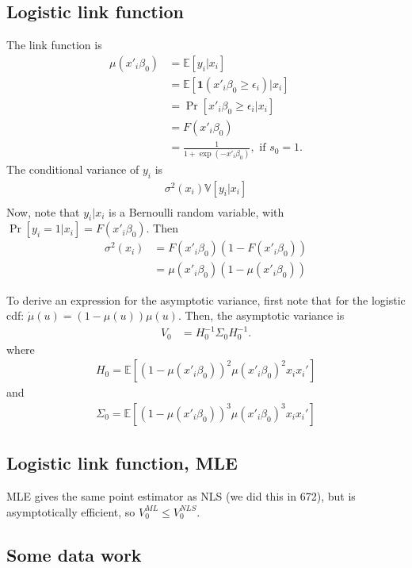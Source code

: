 \documentclass[12pt]{article}
\newcommand{\E}{\mathbb{E}}
\newcommand{\V}{\mathbb{V}}
\newcommand{\e}{\epsilon}
\newcommand{\mtx}[1]{\ensuremath{\bm{\mathit{#1}}}}
\begin{document}
\subsection{Logistic link function}
The link function is
\begin{align*}
\mu(\mtx{x}'_i\mtx{\beta}_0) &=\E[y_i|\mtx{x}_i]\\
&= \E[\bm{1}(\mtx{x}'_i\mtx{\beta}_0 \geq \e_i) |\mtx{x}_i ]\\
&=\Pr[\mtx{x}'_i\mtx{\beta}_0 \geq \e_i |\mtx{x}_i ]\\
&= F(\mtx{x}'_i\mtx{\beta}_0)\\
&= \frac{1}{1+ \exp(-\mtx{x}'_i\mtx{\beta}_0)}, \text{ if } s_0 = 1.
\end{align*}
The conditional variance of $y_i$ is
\begin{align*}
\sigma^2(\mtx{x}_i)  \V[y_i | \mtx{x}_i]\\
\end{align*}
Now, note that $y_i|\mtx{x}_i$ is a Bernoulli random variable, with $\Pr[y_i=1 |\mtx{x}_i] = F(\mtx{x}'_i\mtx{\beta}_0)$. Then
\begin{align*}
\sigma^2(\mtx{x}_i)  &= F(\mtx{x}'_i\mtx{\beta}_0)(1-F(\mtx{x}'_i\mtx{\beta}_0))\\
&= \mu(\mtx{x}'_i\mtx{\beta}_0)(1-\mu(\mtx{x}'_i\mtx{\beta}_0))
\end{align*}

To derive an expression for the asymptotic variance, first note that for the logistic cdf: $\dot \mu(u) = (1-\mu(u))\mu(u)$. Then, the asymptotic variance is 
\begin{align*}
\mtx{V}_0 &= H_0^{-1}\Sigma_0 H_0^{-1}.
\end{align*}
where
\begin{align*}
H_0 = \E[(1-\mu(\mtx{x}'_i\mtx{\beta}_0))^2 \mu(\mtx{x}'_i\mtx{\beta}_0)^2 \mtx{x}_i\mtx{x}_i']
\end{align*}
and
\begin{align*}
\Sigma_0 =  \E[(1-\mu(\mtx{x}'_i\mtx{\beta}_0))^3 \mu(\mtx{x}'_i\mtx{\beta}_0)^3 \mtx{x}_i\mtx{x}_i']
\end{align*}

\subsection{Logistic link function, MLE}
MLE gives the same point estimator as NLS (we did this in 672), but is asymptotically efficient, so $\mtx{V}_0^{ML} \leq \mtx{V}_0^{NLS}$.

\subsection{Some data work}
\end{document}
